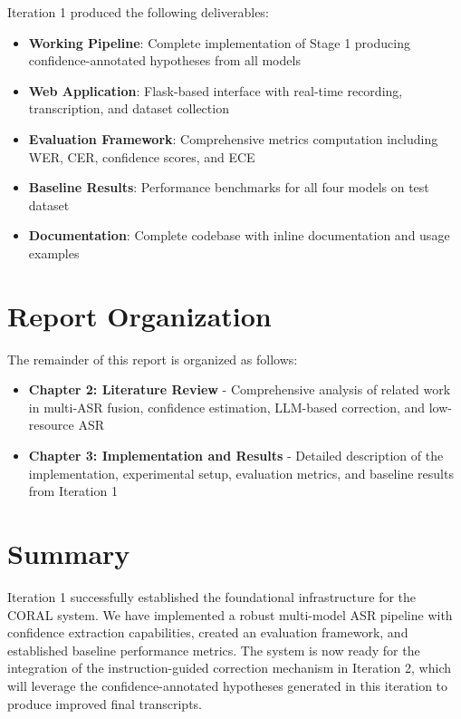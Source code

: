 Iteration 1 produced the following deliverables:

\begin{itemize}
    \item \textbf{Working Pipeline}: Complete implementation of Stage 1 producing confidence-annotated hypotheses from all models
    \item \textbf{Web Application}: Flask-based interface with real-time recording, transcription, and dataset collection
    \item \textbf{Evaluation Framework}: Comprehensive metrics computation including WER, CER, confidence scores, and ECE
    \item \textbf{Baseline Results}: Performance benchmarks for all four models on test dataset
    \item \textbf{Documentation}: Complete codebase with inline documentation and usage examples
\end{itemize}

\section{Report Organization}

The remainder of this report is organized as follows:

\begin{itemize}
    \item \textbf{Chapter 2: Literature Review} - Comprehensive analysis of related work in multi-ASR fusion, confidence estimation, LLM-based correction, and low-resource ASR
    
    \item \textbf{Chapter 3: Implementation and Results} - Detailed description of the implementation, experimental setup, evaluation metrics, and baseline results from Iteration 1
\end{itemize}

\section{Summary}

Iteration 1 successfully established the foundational infrastructure for the CORAL system. We have implemented a robust multi-model ASR pipeline with confidence extraction capabilities, created an evaluation framework, and established baseline performance metrics. The system is now ready for the integration of the instruction-guided correction mechanism in Iteration 2, which will leverage the confidence-annotated hypotheses generated in this iteration to produce improved final transcripts.